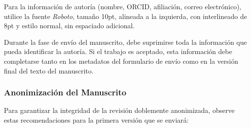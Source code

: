 \documentclass[spanish]{rbie2026}%
\begin{document}
Para la información de autoría (nombre, ORCID, afiliación, correo electrónico), utilice la fuente \textit{Roboto}, tamaño 10pt, alineada a la izquierda, con interlineado de 8pt y estilo normal, sin espaciado adicional.

Durante la fase de envío del manuscrito, debe suprimirse toda la información que pueda identificar la autoría. Si el trabajo es aceptado, esta información debe completarse tanto en los metadatos del formulario de envío como en la versión final del texto del manuscrito.


\subsubsection{Anonimización del Manuscrito}

Para garantizar la integridad de la revisión doblemente anonimizada, observe estas recomendaciones para la primera versión que se enviará:
\end{document}
